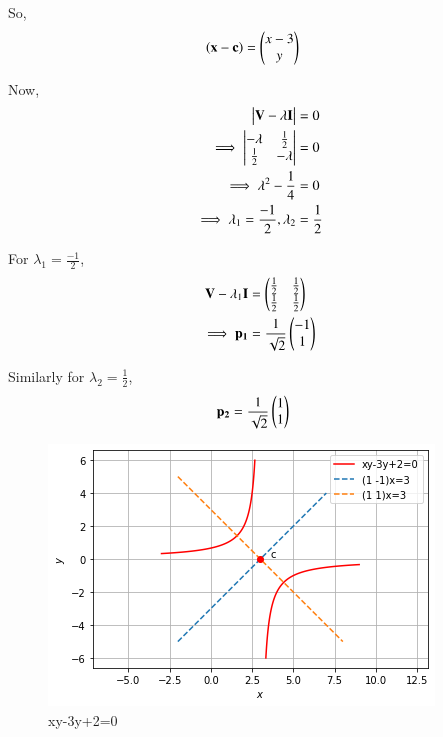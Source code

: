 \begin{enumerate}
    So,
    \begin{align}
    \left(\mathbf{x}-\mathbf{c}\right) &= \begin{pmatrix}x-3 \\ y\end{pmatrix}
    \end{align}

    Now,
    \begin{align}
        \begin{vmatrix}\mathbf{V}-\lambda\mathbf{I}\end{vmatrix} &= 0 \\
        \implies \begin{vmatrix}-\lambda & \frac{1}{2} \\ \frac{1}{2} & -\lambda\end{vmatrix} &= 0 \\
        \implies \lambda^2-\frac{1}{4} &= 0 \\
        \implies \lambda_1 =\frac{-1}{2},\lambda_2 &= \frac{1}{2}
    \end{align}
    
    For $\lambda_1=\frac{-1}{2}$,
    \begin{align}
        \mathbf{V}-\lambda_1\mathbf{I} &= \begin{pmatrix}\frac{1}{2} & \frac{1}{2} \\ \frac{1}{2} & \frac{1}{2}\end{pmatrix} \\
        \implies \mathbf{p_1} &= \frac{1}{\sqrt{2}}\begin{pmatrix}-1 \\ 1\end{pmatrix}
    \end{align}
    
    Similarly for $\lambda_2=\frac{1}{2}$,
    \begin{align}
        \mathbf{p_2} &= \frac{1}{\sqrt{2}}\begin{pmatrix}1 \\ 1\end{pmatrix}
    \end{align}
    
    \begin{figure}[!ht]
    \centering
    \includegraphics[width=\columnwidth]{app/2/Figures/ChallengeProblem5_5.png}
    \caption{xy-3y+2=0}
    \label{quadform/app/2/ex5}	
    \end{figure}
    

\end{enumerate}
